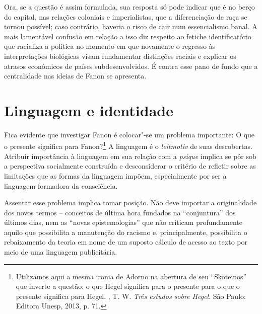 Ora, se a questão é assim formulada, sua resposta só pode indicar que é
no berço do capital, nas relações coloniais e imperialistas, que a
diferenciação de raça se tornou possível; caso contrário, haveria o
risco de cair num essencialismo banal. A mais lamentável confusão em
relação a isso diz respeito ao fetiche identificatório que racializa a
política no momento em que novamente o regresso às interpretações
biológicas visam fundamentar distinções raciais e explicar os atrasos
econômicos de países subdesenvolvidos. É contra esse pano de fundo que a
centralidade nas ideias de Fanon se apresenta.

\chapter{Linguagem e identidade}

Fica evidente que investigar Fanon é colocar"-se um problema importante:
O que o presente significa para Fanon?\footnote{Utilizamos aqui a mesma
  ironia de Adorno na abertura de seu ``Skoteinos'' que inverte a questão: o
  que Hegel significa para o presente para o que o presente significa
  para Hegel. , T. W. \emph{Três estudos sobre Hegel}. São Paulo:
  Editora Unesp, 2013, p. 71.} A linguagem é o \emph{leitmotiv} de suas
descobertas. Atribuir importância à linguagem em sua relação com a
\emph{psique} implica se pôr sob a perspectiva socialmente construída e
desconsiderar o critério de refletir sobre as limitações que as formas
da linguagem impõem, especialmente por ser a linguagem formadora da
consciência.

Assentar esse problema implica tomar posição. Não deve importar a
originalidade dos novos termos -- conceitos de última hora fundados na
``conjuntura'' dos últimos dias, nem as ``novas epistemologias'' que não
criticam profundamente aquilo que possibilita a manutenção do racismo e,
principalmente, possibilita o rebaixamento da teoria em nome de um
suposto cálculo de acesso ao texto por meio de uma linguagem
publicitária.

